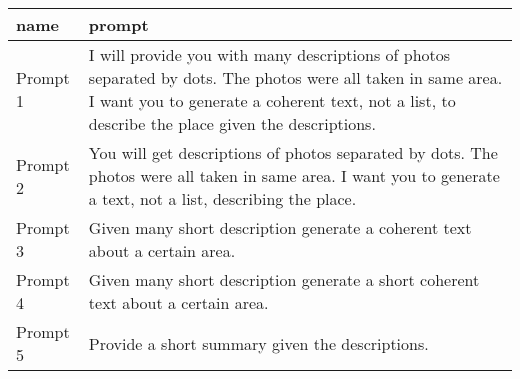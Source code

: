 \begin{tabular}{ll}
\toprule
name & prompt \\
\midrule
Prompt 1 & I will provide you with many descriptions of photos separated by dots. The photos were all taken in same area. I want you to generate a coherent text, not a list, to describe the place given the descriptions. \\
Prompt 2 & You will get descriptions of photos separated by dots. The photos were all taken in same area. I want you to generate a text, not a list, describing the place. \\
Prompt 3 & Given many short description generate a coherent text about a certain area. \\
Prompt 4 & Given many short description generate a short coherent text about a certain area. \\
Prompt 5 & Provide a short summary given the descriptions. \\
\bottomrule
\end{tabular}
